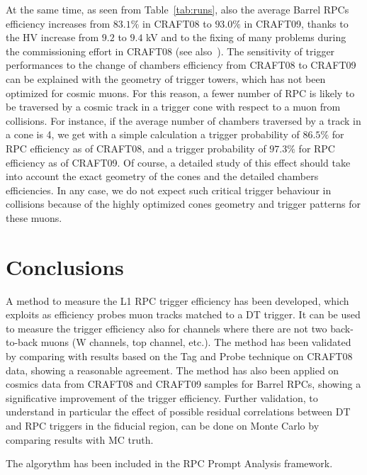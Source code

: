At the same time, as seen from Table~\ref{tab:runs}, also the average Barrel RPCs 
efficiency increases from $83.1\%$ in CRAFT08 to $93.0\%$ in CRAFT09, thanks to the HV increase 
from $9.2$ to $9.4$ kV and to the fixing of many problems during the commissioning 
effort in CRAFT08 (see also~\cite{ref:craft08pap}). The sensitivity of trigger performances 
to the change of chambers efficiency from CRAFT08
to CRAFT09 can be explained with the geometry of trigger
towers, which has not been optimized for cosmic muons. For this reason,
a fewer number of RPC is likely to be traversed by a cosmic track 
in a trigger cone with respect to a muon from collisions. For instance, if the average number 
of chambers traversed by a track in a cone is 4, we get with a simple calculation 
a trigger probability of $86.5\%$ for RPC efficiency as of CRAFT08, and a trigger probability of 
$97.3\%$ for RPC efficiency as of CRAFT09. 
Of course, a detailed study of this effect should take into account the exact geometry of the 
cones and the detailed chambers efficiencies.
In any case, we do not expect such critical trigger behaviour in collisions because 
of the highly optimized cones geometry and trigger patterns for these muons.

\section{Conclusions}
A method to measure the L1 RPC trigger efficiency has been developed,
which exploits as efficiency probes muon tracks matched to a DT trigger. 
It can be used to measure the trigger efficiency also for channels where 
there are not two back-to-back muons (W channels, top channel, etc.).
The method has been validated by comparing with results based on the Tag and Probe 
technique on CRAFT08 data, showing a reasonable agreement.
The method has also been applied on cosmics data from CRAFT08 and CRAFT09
samples for Barrel RPCs, showing a significative improvement of the trigger efficiency.
Further validation, to understand in particular the effect of possible residual correlations
between DT and RPC triggers in the fiducial region, can be done on Monte Carlo by comparing 
results with MC truth.

The algorythm has been included in the RPC Prompt Analysis framework.



